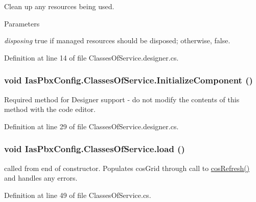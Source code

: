 Clean up any resources being used. 
\begin{DoxyParams}{Parameters}
\item[{\em disposing}]true if managed resources should be disposed; otherwise, false.\end{DoxyParams}


Definition at line 14 of file ClassesOfService.designer.cs.\hypertarget{class_ias_pbx_config_1_1_classes_of_service_a384f92ca416d7a9cd4b17675d06c7b07}{
\subsubsection[{InitializeComponent}]{\setlength{\rightskip}{0pt plus 5cm}void IasPbxConfig.ClassesOfService.InitializeComponent ()}}
\label{class_ias_pbx_config_1_1_classes_of_service_a384f92ca416d7a9cd4b17675d06c7b07}


Required method for Designer support -\/ do not modify the contents of this method with the code editor. 

Definition at line 29 of file ClassesOfService.designer.cs.\hypertarget{class_ias_pbx_config_1_1_classes_of_service_afe758d8a2d66ee16d2c23401a6c62894}{
\subsubsection[{load}]{\setlength{\rightskip}{0pt plus 5cm}void IasPbxConfig.ClassesOfService.load ()}}
\label{class_ias_pbx_config_1_1_classes_of_service_afe758d8a2d66ee16d2c23401a6c62894}


called from end of constructor. Populates cosGrid through call to \hyperlink{class_ias_pbx_config_1_1_classes_of_service_ade0a8c01686723c46356a0118b50cb8a}{cosRefresh()} and handles any errors. 

Definition at line 49 of file ClassesOfService.cs.

